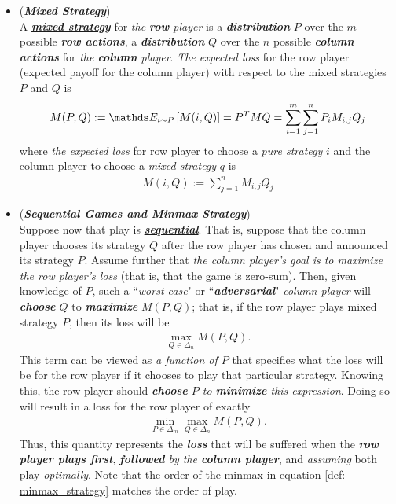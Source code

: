 \documentclass[11pt]{article}
\begin{document}
\begin{itemize}
\item \begin{definition}(\textbf{\emph{Mixed Strategy}}) \citep{schapire2012boosting, mohri2018foundations} \\
A \underline{\emph{\textbf{mixed strategy}}} for \emph{the \textbf{row} player} is a \emph{\textbf{distribution}} $P$ over the $m$ possible \emph{\textbf{row actions}}, a \emph{\textbf{distribution}} $Q$ over the $n$ possible \emph{\textbf{column actions}} for \emph{the \textbf{column} player}.
\emph{The expected loss} for the row player (expected payoff for the column player) with respect to the mixed strategies $P$ and $Q$ is
\begin{align}
M(P, Q) := \E{i \sim P}{M(i, Q) } = P^T M Q = \sum_{i = 1}^{m}\sum_{j=1}^{n}P_{i}M_{i,j}Q_{j} \label{def: mixed_strategy}
\end{align} where \emph{the expected loss} for row player to choose a \emph{pure strategy} $i$ and the column player to choose a \emph{mixed strategy} $q$ is
\begin{align*}
M(i, Q) := \sum_{j=1}^{n}M_{i,j}Q_{j}
\end{align*}
\end{definition}

\item \begin{definition}(\textbf{\emph{Sequential  Games and Minmax Strategy}}) \citep{schapire2012boosting, mohri2018foundations} \\
Suppose now that play is \underline{\emph{\textbf{sequential}}}. That is, suppose that the column player chooses its strategy $Q$ after the row player has chosen and announced its strategy $P$. Assume further that \emph{the column player's goal is to maximize the row player's loss} (that is, that the game is zero-sum). Then, given knowledge of $P$, such a ``\emph{worst-case}" or ``\emph{\textbf{adversarial}}" \emph{column player} will \emph{\textbf{choose} $Q$} to \emph{\textbf{maximize}} $M(P, Q)$; that is, if the row player plays mixed strategy $P$, then its loss will be
\begin{align*}
\max_{Q \in \Delta_{n}}M(P, Q).
\end{align*} This term can be viewed as \emph{a function of $P$} that specifies what the loss will be for the row player if it chooses to play that particular strategy. Knowing this, the row player should \emph{\textbf{choose} $P$ to \textbf{minimize} this expression}. Doing so will result in a loss for the row player of exactly
\begin{align}
\min_{P \in \Delta_{m}}\max_{Q \in \Delta_{n}}M(P, Q). \label{def: minmax_strategy}
\end{align} Thus, this quantity represents the \emph{\textbf{loss}} that will be suffered when the \emph{\textbf{row player plays first}}, \emph{\textbf{followed} by the \textbf{column player}}, and \emph{assuming} both play \emph{optimally}. Note that the order of the minmax in equation \eqref{def: minmax_strategy} matches the order of play.


\end{definition}
\end{itemize}
\end{document}
